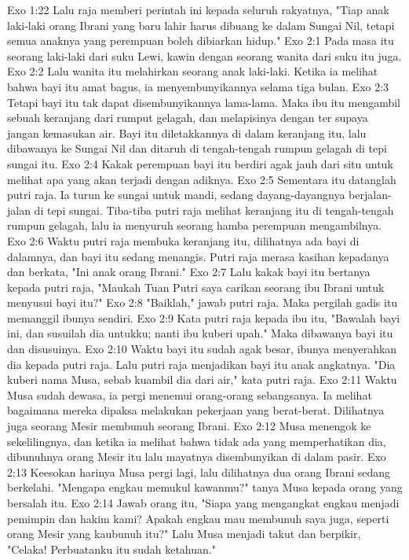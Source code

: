 Exo 1:22  Lalu raja memberi perintah ini kepada seluruh rakyatnya, "Tiap anak laki-laki orang Ibrani yang baru lahir harus dibuang ke dalam Sungai Nil, tetapi semua anaknya yang perempuan boleh dibiarkan hidup."
Exo 2:1  Pada masa itu seorang laki-laki dari suku Lewi, kawin dengan seorang wanita dari suku itu juga.
Exo 2:2  Lalu wanita itu melahirkan seorang anak laki-laki. Ketika ia melihat bahwa bayi itu amat bagus, ia menyembunyikannya selama tiga bulan.
Exo 2:3  Tetapi bayi itu tak dapat disembunyikannya lama-lama. Maka ibu itu mengambil sebuah keranjang dari rumput gelagah, dan melapisinya dengan ter supaya jangan kemasukan air. Bayi itu diletakkannya di dalam keranjang itu, lalu dibawanya ke Sungai Nil dan ditaruh di tengah-tengah rumpun gelagah di tepi sungai itu.
Exo 2:4  Kakak perempuan bayi itu berdiri agak jauh dari situ untuk melihat apa yang akan terjadi dengan adiknya.
Exo 2:5  Sementara itu datanglah putri raja. Ia turun ke sungai untuk mandi, sedang dayang-dayangnya berjalan-jalan di tepi sungai. Tiba-tiba putri raja melihat keranjang itu di tengah-tengah rumpun gelagah, lalu ia menyuruh seorang hamba perempuan mengambilnya.
Exo 2:6  Waktu putri raja membuka keranjang itu, dilihatnya ada bayi di dalamnya, dan bayi itu sedang menangis. Putri raja merasa kasihan kepadanya dan berkata, "Ini anak orang Ibrani."
Exo 2:7  Lalu kakak bayi itu bertanya kepada putri raja, "Maukah Tuan Putri saya carikan seorang ibu Ibrani untuk menyusui bayi itu?"
Exo 2:8  "Baiklah," jawab putri raja. Maka pergilah gadis itu memanggil ibunya sendiri.
Exo 2:9  Kata putri raja kepada ibu itu, "Bawalah bayi ini, dan susuilah dia untukku; nanti ibu kuberi upah." Maka dibawanya bayi itu dan disusuinya.
Exo 2:10  Waktu bayi itu sudah agak besar, ibunya menyerahkan dia kepada putri raja. Lalu putri raja menjadikan bayi itu anak angkatnya. "Dia kuberi nama Musa, sebab kuambil dia dari air," kata putri raja.
Exo 2:11  Waktu Musa sudah dewasa, ia pergi menemui orang-orang sebangsanya. Ia melihat bagaimana mereka dipaksa melakukan pekerjaan yang berat-berat. Dilihatnya juga seorang Mesir membunuh seorang Ibrani.
Exo 2:12  Musa menengok ke sekelilingnya, dan ketika ia melihat bahwa tidak ada yang memperhatikan dia, dibunuhnya orang Mesir itu lalu mayatnya disembunyikan di dalam pasir.
Exo 2:13  Keesokan harinya Musa pergi lagi, lalu dilihatnya dua orang Ibrani sedang berkelahi. "Mengapa engkau memukul kawanmu?" tanya Musa kepada orang yang bersalah itu.
Exo 2:14  Jawab orang itu, "Siapa yang mengangkat engkau menjadi pemimpin dan hakim kami? Apakah engkau mau membunuh saya juga, seperti orang Mesir yang kaubunuh itu?" Lalu Musa menjadi takut dan berpikir, "Celaka! Perbuatanku itu sudah ketahuan."
